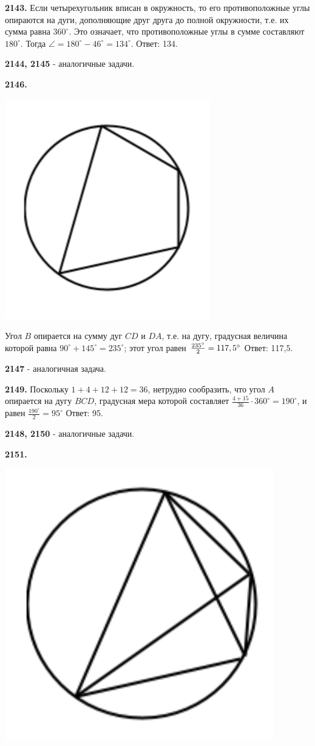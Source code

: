 \textbf{2143.} Если четырехугольник вписан в окружность, то его противоположные углы опираются на дуги, дополняющие друг друга до полной окружности, т.е. их сумма равна $360^\circ$. Это означает, что противоположные углы в сумме составляют $180^\circ$. Тогда $\angle = 180^\circ - 46^\circ=134^\circ$. \newline \null \hspace*{\fill} Ответ: 134.

\textbf{2144, 2145} - аналогичные задачи.

\textbf{2146.}

{\centering \includegraphics[width=0.35\linewidth]{Geometry/Content/43.png}
	
}

Угол $B$ опирается на сумму дуг $CD$ и $DA$, т.е. на дугу, градусная величина которой равна $90^\circ+145^\circ=235^\circ$; этот угол равен $\linebreak \frac{235^\circ}{2}=117,5^\circ$ \newline \null \hspace*{\fill} Ответ: 117,5.

\textbf{2147} - аналогичная задача.

\textbf{2149.}  Поскольку $1+4+12+12=36$, нетрудно сообразить, что угол $A$ опирается на дугу $BCD$, градусная мера которой составляет $\frac{4+15}{36}\cdot360^\circ=190^\circ$, и равен $\frac{190^\circ}{2}=95^\circ$ \newline \null \hspace*{\fill} Ответ: 95.

\textbf{2148, 2150} - аналогичные задачи.

\textbf{2151.}

{\centering \includegraphics[width=0.35\linewidth]{Geometry/Content/44.png}
	
}

